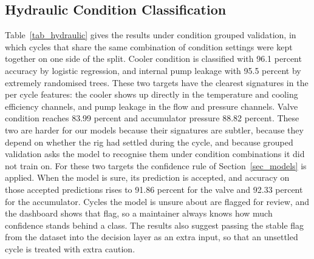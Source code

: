 \documentclass[conference]{IEEEtran}
\begin{document}
\subsection{Hydraulic Condition Classification}
Table~\ref{tab_hydraulic} gives the results under condition grouped validation, in which cycles that share the same combination of condition settings were kept together on one side of the split. Cooler condition is classified with 96.1 percent accuracy by logistic regression, and internal pump leakage with 95.5 percent by extremely randomised trees. These two targets have the clearest signatures in the per cycle features: the cooler shows up directly in the temperature and cooling efficiency channels, and pump leakage in the flow and pressure channels. Valve condition reaches 83.99 percent and accumulator pressure 88.82 percent. These two are harder for our models because their signatures are subtler, because they depend on whether the rig had settled during the cycle, and because grouped validation asks the model to recognise them under condition combinations it did not train on. For these two targets the confidence rule of Section~\ref{sec_models} is applied. When the model is sure, its prediction is accepted, and accuracy on those accepted predictions rises to 91.86 percent for the valve and 92.33 percent for the accumulator. Cycles the model is unsure about are flagged for review, and the dashboard shows that flag, so a maintainer always knows how much confidence stands behind a class. The results also suggest passing the stable flag from the dataset into the decision layer as an extra input, so that an unsettled cycle is treated with extra caution.
\end{document}
